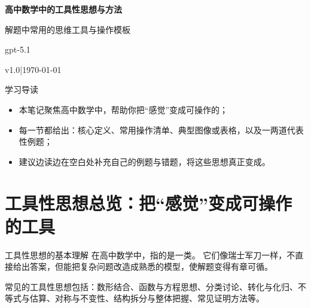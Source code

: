 \documentclass[a4paper,11pt]{ctexart}
\renewcommand{\notetitle}{高中数学中的工具性思想与方法}
\renewcommand{\noteauthor}{gpt-5.1}
\renewcommand{\notedate}{\today}
\renewcommand{\notesubtitle}{解题中常用的思维工具与操作模板}
\renewcommand{\noteversion}{v1.0}
\begin{document}
\thispagestyle{empty}
\setcounter{page}{1}

\noindent
\begin{minipage}[t][0.7\textheight][c]{\textwidth}
  \raggedleft
  \vspace*{\fill}
  {\sffamily\bfseries\Huge\color{accent}\notetitle\par}
  \vspace{0.6em}
  {\Large\color{inkgray}\notesubtitle\par}
  \vspace{0.5em}
  {\large\color{inkgray}\noteauthor\par}
  \vspace{0.4em}
  {\normalsize\color{inkgray}\noteversion\quad|\quad\notedate\par}
  \vspace*{\fill}
\end{minipage}

\begin{center}
\begin{minipage}{0.82\textwidth}
\textcolor{inkgray}{\sffamily\small 学习导读}\\
\begin{itemize}
  \item 本笔记聚焦高中数学中，帮助你把“感觉”变成可操作的；
  \item 每一节都给出：核心定义、常用操作清单、典型图像或表格，以及一两道代表性例题；
  \item 建议边读边在空白处补充自己的例题与错题，将这些思想真正变成。
\end{itemize}
\end{minipage}
\end{center}

\clearpage
\thispagestyle{plain}
\tableofcontents

\section{工具性思想总览：把“感觉”变成可操作的工具}

\begin{definitionbox}{工具性思想的基本理解}
在高中数学中，指的是一类。
它们像瑞士军刀一样，不直接给出答案，但能把复杂问题改造成熟悉的模型，使解题变得有章可循。
\par
常见的工具性思想包括：数形结合、函数与方程思想、分类讨论、转化与化归、不等式与估算、对称与不变性、结构拆分与整体把握、常见证明方法等。
\end{definitionbox}
\end{document}
